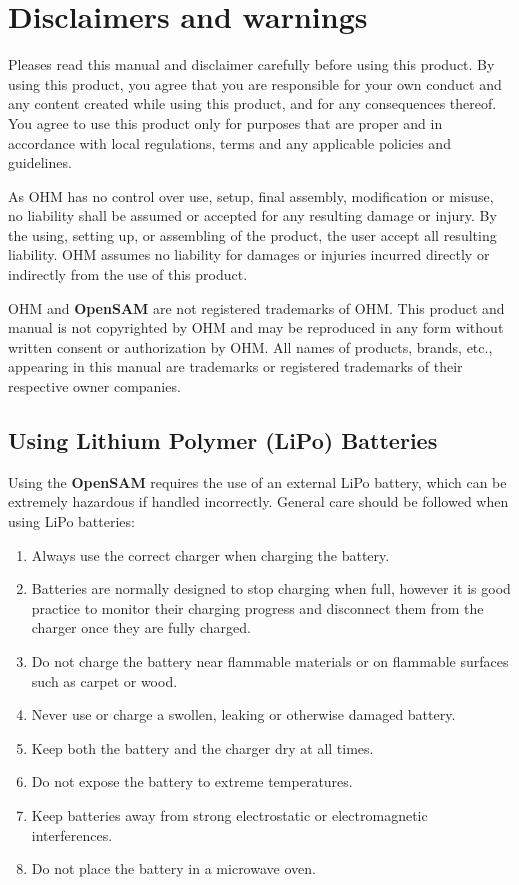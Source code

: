 \chapter{Disclaimers and warnings}


Pleases read this manual and disclaimer carefully before using this product. By using this product, you agree that you are responsible for your own conduct and any content created while using this product, and for any consequences thereof. You agree to use this product only for purposes that are proper and in accordance with local regulations, terms and any applicable policies and guidelines.

As OHM has no control over use, setup, final assembly, modification or misuse, no liability shall be assumed or accepted for any resulting damage or injury. By the using, setting up, or assembling of the product, the user accept all resulting liability. OHM assumes no liability for damages or injuries incurred directly or indirectly from the use of this product.

OHM and \textbf{\textsf{OpenSAM}} are not registered trademarks of OHM. This product and manual is not copyrighted by OHM and may be reproduced in any form without written consent or authorization by OHM. All names of products, brands, etc., appearing in this manual are trademarks or registered trademarks of their respective owner companies.


\section{Using Lithium Polymer (LiPo) Batteries}

Using the \textbf{\textsf{OpenSAM}} requires the use of an external LiPo battery, which can be extremely hazardous if handled incorrectly. General care should be followed when using LiPo batteries:
\begin{enumerate}
\item Always use the correct charger when charging the battery.
\item Batteries are normally designed to stop charging when full, however it is good practice to
monitor their charging progress and disconnect them from the charger once they are fully
charged.
\item Do not charge the battery near flammable materials or on flammable surfaces such as carpet
or wood.
\item Never use or charge a swollen, leaking or otherwise damaged battery.
\item Keep both the battery and the charger dry at all times.
\item Do not expose the battery to extreme temperatures.
\item Keep batteries away from strong electrostatic or electromagnetic interferences.
\item Do not place the battery in a microwave oven.
\end{enumerate}

